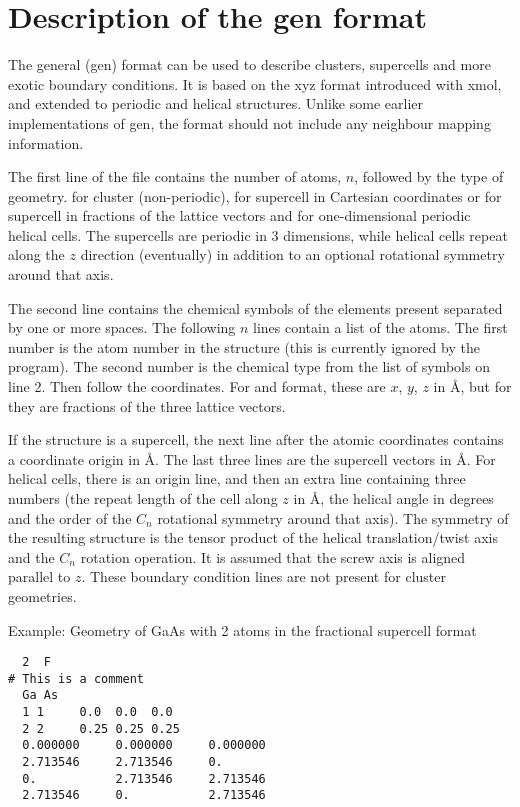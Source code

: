
\chapter{Description of the gen format}
\label{app:gen}

The general (gen) format can be used to describe clusters, supercells and more
exotic boundary conditions. It is based on the xyz format introduced with xmol,
and extended to periodic and helical structures. Unlike some earlier
implementations of gen, the format should not include any neighbour mapping
information.

The first line of the file contains the number of atoms, $n$, followed by the
type of geometry.  for cluster (non-periodic),  for supercell in
Cartesian coordinates or  for supercell in fractions of the lattice
vectors and  for one-dimensional periodic helical cells. The supercells
are periodic in 3 dimensions, while helical cells repeat along the $z$ direction
(eventually) in addition to an optional rotational symmetry around that axis.

The second line contains the chemical symbols of the elements present
separated by one or more spaces.  The following $n$ lines contain a
list of the atoms. The first number is the atom number in the
structure (this is currently ignored by the program). The second
number is the chemical type from the list of symbols on line 2. Then
follow the coordinates. For  and  format, these are $x$,
$y$, $z$ in {\AA}, but for  they are fractions of the three
lattice vectors.

If the structure is a supercell, the next line after the atomic coordinates
contains a coordinate origin in {\AA}. The last three lines are the supercell
vectors in {\AA}. For helical cells, there is an origin line, and then an
extra line containing three numbers (the repeat length of the cell along $z$ in
{\AA}, the helical angle in degrees and the order of the $C_n$ rotational
symmetry around that axis). The symmetry of the resulting structure is the
tensor product of the helical translation/twist axis and the $C_n$ rotation
operation. It is assumed that the screw axis is aligned parallel to $z$. These
boundary condition lines are not present for cluster geometries.

Example: Geometry of GaAs with 2 atoms in the fractional supercell
format
\begin{verbatim}
  2  F
# This is a comment
  Ga As
  1 1     0.0  0.0  0.0
  2 2     0.25 0.25 0.25
  0.000000     0.000000     0.000000
  2.713546     2.713546     0.      
  0.           2.713546     2.713546
  2.713546     0.           2.713546
\end{verbatim}

